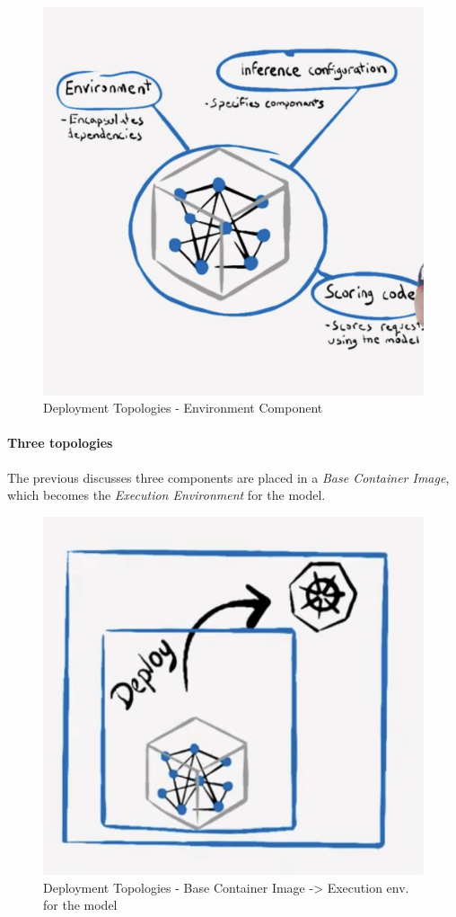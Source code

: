 \begin{figure}[H]
	\centering
	\includegraphics[scale = 0.2]{attachment/chapter_10/Scc013}
	\caption{Deployment Topologies - Environment Component}
\end{figure}

\paragraph{Three topologies}
The previous discusses three components are placed in a \textit{Base Container Image}, which becomes the \textit{Execution Environment} for the model. 

\begin{figure}[H]
	\centering
	\includegraphics[scale = 0.3]{attachment/chapter_10/Scc014}
	\caption{Deployment Topologies - Base Container Image -> Execution env. for the model}
\end{figure}


